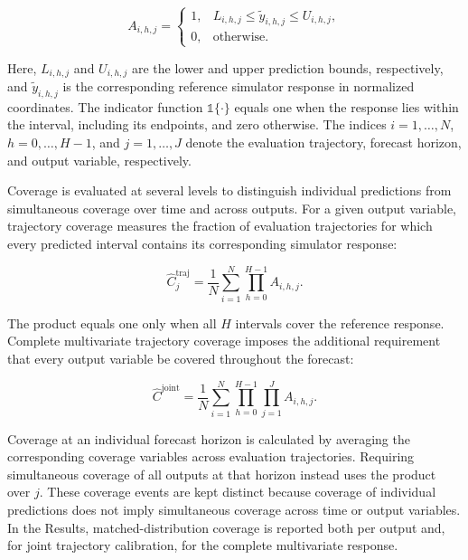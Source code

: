 \begin{equation}
A_{i,h,j}=
\begin{cases}
1, & L_{i,h,j}\leq\widetilde y_{i,h,j}\leq U_{i,h,j},\\
0, & \text{otherwise}.
\end{cases}
\label{eq:mace:indicator}
\end{equation}

Here, $L_{i,h,j}$ and $U_{i,h,j}$ are the lower and upper prediction bounds, respectively, and $\widetilde y_{i,h,j}$ is the corresponding reference simulator response in normalized coordinates. The indicator function $\mathbb{1}\{\cdot\}$ equals one when the response lies within the interval, including its endpoints, and zero otherwise. The indices $i=1,\ldots,N$, $h=0,\ldots,H-1$, and $j=1,\ldots,J$ denote the evaluation trajectory, forecast horizon, and output variable, respectively.

Coverage is evaluated at several levels to distinguish individual predictions from simultaneous coverage over time and across outputs. For a given output variable, trajectory coverage measures the fraction of evaluation trajectories for which every predicted interval contains its corresponding simulator response:

\begin{equation}
 \widehat C_j^{\mathrm{traj}}=
 \frac{1}{N}\sum_{i=1}^{N}
 \prod_{h=0}^{H-1} A_{i,h,j}.
 \label{eq:mace:targetcoverage}
\end{equation}

The product equals one only when all $H$ intervals cover the reference response. Complete multivariate trajectory coverage imposes the additional requirement that every output variable be covered throughout the forecast:

\begin{equation}
 \widehat C^{\mathrm{joint}}=
 \frac{1}{N}\sum_{i=1}^{N}
 \prod_{h=0}^{H-1}\prod_{j=1}^{J}A_{i,h,j}.
 \label{eq:mace:jointcoverage}
\end{equation}

Coverage at an individual forecast horizon is calculated by averaging the corresponding coverage variables across evaluation trajectories. Requiring simultaneous coverage of all outputs at that horizon instead uses the product over $j$. These coverage events are kept distinct because coverage of individual predictions does not imply simultaneous coverage across time or output variables. In the Results, matched-distribution coverage is reported both per output and, for joint trajectory calibration, for the complete multivariate response.

